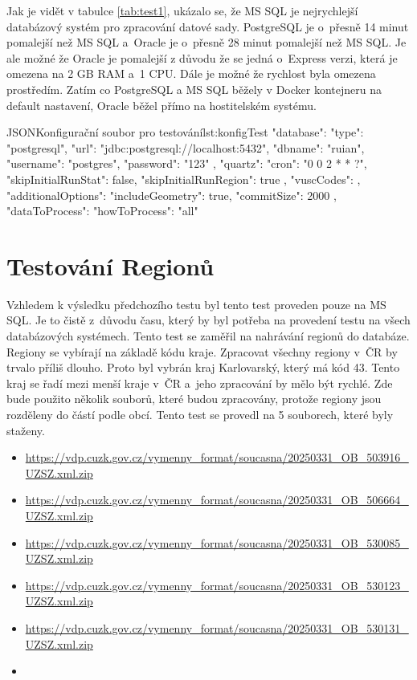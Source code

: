 Jak je vidět v tabulce \ref{tab:test1}, ukázalo se, že MS SQL je nejrychlejší databázový systém pro zpracování datové sady.
PostgreSQL je o~přesně 14 minut pomalejší než MS SQL a~Oracle je o~přesně 28 minut pomalejší než MS SQL.
Je ale možné že Oracle je pomalejší z důvodu že se jedná o~Express verzi, která je omezena na 2 GB RAM a~1 CPU.
Dále je možné že rychlost byla omezena prostředím. Zatím co PostgreSQL a MS SQL běžely v Docker kontejneru na default nastavení, 
Oracle běžel přímo na hostitelském systému.

\begin{code}{JSON}{Konfigurační soubor pro testování}{lst:konfigTest}
  {
    "database": {
      "type": "postgresql",
      "url": "jdbc:postgresql://localhost:5432",
      "dbname": "ruian",
      "username": "postgres",
      "password": "123"
    },
    "quartz": {
      "cron": "0 0 2 * * ?",
      "skipInitialRunStat": false,
      "skipInitialRunRegion": true
    },
    "vuscCodes": {},
    "additionalOptions": {
      "includeGeometry": true,
      "commitSize": 2000
    },
    "dataToProcess": {
      "howToProcess": "all"
    }
  }
\end{code}


\section{Testování Regionů}
Vzhledem k výsledku předchozího testu byl tento test proveden pouze na MS SQL.
Je to čistě z~důvodu času, který by byl potřeba na provedení testu na všech databázových systémech.
Tento test se zaměřil na nahrávání regionů do databáze.
Regiony se vybírají na základě kódu kraje. Zpracovat všechny regiony v~ČR by trvalo příliš dlouho.
Proto byl vybrán kraj Karlovarský, který má kód 43.
Tento kraj se řadí mezi menší kraje v~ČR a~jeho zpracování by mělo být rychlé.
Zde bude použito několik souborů, které budou zpracovány, protože regiony jsou rozděleny do částí podle obcí.
Tento test se provedl na 5 souborech, které byly staženy.
\begin{itemize}
  \item \url{https://vdp.cuzk.gov.cz/vymenny_format/soucasna/20250331_OB_503916_UZSZ.xml.zip}
  \item \url{https://vdp.cuzk.gov.cz/vymenny_format/soucasna/20250331_OB_506664_UZSZ.xml.zip}
  \item \url{https://vdp.cuzk.gov.cz/vymenny_format/soucasna/20250331_OB_530085_UZSZ.xml.zip}
  \item \url{https://vdp.cuzk.gov.cz/vymenny_format/soucasna/20250331_OB_530123_UZSZ.xml.zip}
  \item \url{https://vdp.cuzk.gov.cz/vymenny_format/soucasna/20250331_OB_530131_UZSZ.xml.zip}
  \item 
\end{itemize}

